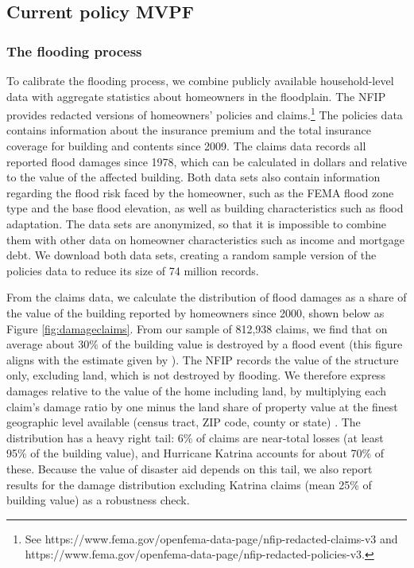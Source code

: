 \documentclass[12pt]{article}
\begin{document}
\subsection{Current policy MVPF}\label{subsec:calib_current}

\subsubsection{The flooding process}

To calibrate the flooding process, we combine publicly available household-level data with aggregate statistics about homeowners in the floodplain. The NFIP provides redacted versions of homeowners' policies and claims.\footnote{See https://www.fema.gov/openfema-data-page/nfip-redacted-claims-v3 and https://www.fema.gov/openfema-data-page/nfip-redacted-policies-v3.} The policies data contains information about the insurance premium and the total insurance coverage for building and contents since 2009. The claims data records all reported flood damages since 1978, which can be calculated in dollars and relative to the value of the affected building. Both data sets also contain information regarding the flood risk faced by the homeowner, such as the FEMA flood zone type and the base flood elevation, as well as building characteristics such as flood adaptation. The data sets are anonymized, so that it is impossible to combine them with other data on homeowner characteristics such as income and mortgage debt. We download both data sets, creating a random sample version of the policies data to reduce its size of 74 million records.

From the claims data, we calculate the distribution of flood damages as a share of the value of the building reported by homeowners since 2000, shown below as Figure \ref{fig:damageclaims}. From our sample of 812,938 claims, we find that on average about 30$\%$ of the building value is destroyed by a flood event (this figure aligns with the estimate given by \cite{fried2022seawalls}). The NFIP records the value of the structure only, excluding land, which is not destroyed by flooding. We therefore express damages relative to the value of the home including land, by multiplying each claim's damage ratio by one minus the land share of property value at the finest geographic level available (census tract, ZIP code, county or state) \citep{davis2019land}. The distribution has a heavy right tail: 6\% of claims are near-total losses (at least 95\% of the building value), and Hurricane Katrina accounts for about 70\% of these. Because the value of disaster aid depends on this tail, we also report results for the damage distribution excluding Katrina claims (mean 25\% of building value) as a robustness check.
\end{document}
